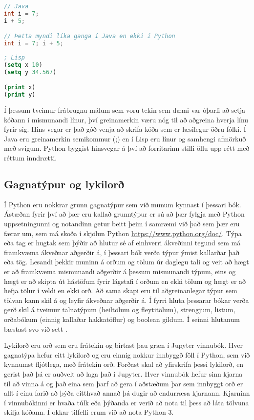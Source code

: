 \begin{lstlisting}[language=Java , caption=Dæmi um annað mál sem er strangt tagað og með greinamerkjum]
// Java
int i = 7;
i + 5;

// Þetta myndi líka ganga í Java en ekki í Python
int i = 7; i + 5;
\end{lstlisting}

\begin{lstlisting}[language=Lisp, caption=Dæmi um annað mál sem byggir á afmörkuðu samhengi en með greinamerkjum]
; Lisp
(setq x 10)
(setq y 34.567)

(print x)
(print y)
\end{lstlisting}

Í þessum tveimur frábrugnu málum sem voru tekin sem dæmi var óþarfi að setja kóðann í mismunandi línur, því greinamerkin væru nóg til að aðgreina hverja línu fyrir sig. 
Hins vegar er það góð venja að skrifa kóða sem er læsilegur öðru fólki. Í Java eru greinamerkin semikommur (;) en í Lisp eru línur og samhengi afmörkuð með svigum. 
Python byggist hinsvegar á því að forritarinn stilli öllu upp rétt með réttum inndrætti. 

\subsection{Gagnatýpur og lykilorð}

Í Python eru nokkrar grunn gagnatýpur sem við munum kynnast í þessari bók. 
Ástæðan fyrir því að þær eru kallað grunntýpur er sú að þær fylgja með Python uppsetningunni og notandinn getur beitt þeim í samræmi við það sem þær eru færar um, sem má skoða í skjölun Python \href{https://www.python.org/doc/}{https://www.python.org/doc/}. 
Týpa eða tag er hugtak sem þýðir að hlutur sé af einhverri ákveðinni tegund sem má framkvæma ákveðnar aðgerðir á, í þessari bók verða týpur ýmist kallarðar það eða tög. 
Lesandi þekkir muninn á orðum og tölum úr daglegu tali og veit að hægt er að framkvæma mismunandi aðgerðir á þessum mismunandi týpum, eins og hægt er að skipta út hástöfum fyrir lágstafi í orðum en ekki tölum og hægt er að hefja tölur í veldi en ekki orð. 
Að sama skapi eru til aðgreinanlegar týpur sem tölvan kann skil á og leyfir ákveðnar aðgerðir á.
Í fyrri hluta þessarar bókar verða gerð skil á tveimur talnatýpum (heiltölum og fleytitölum), strengjum, listum, orðabókum (einnig kallaðar hakkatöflur) og boolean gildum. 
Í seinni hlutanum bæstast svo við sett .

Lykilorð eru orð sem eru frátekin og birtast þau græn í Jupyter vinnubók. 
Hver gagnatýpa hefur eitt lykilorð og eru einnig nokkur innbyggð föll í Python, sem við kynnumst fljótlega, með frátekin orð. 
Forðast skal að yfirskrifa þessi lykilorð, en gerist það þá er auðvelt að laga það í Jupyter. 
Hver vinnubók hefur sinn kjarna til að vinna á og það eina sem þarf að gera í aðstæðum þar sem innbyggt orð er allt í einu farið að þýða eitthvað annað þá dugir að endurræsa kjarnann.
Kjarninn í vinnubókinni er hvaða túlk eða þýðanda er verið að nota til þess að láta tölvuna skilja kóðann.
Í okkar tilfelli erum við að nota Python 3.